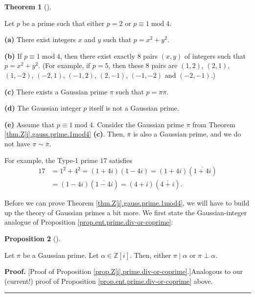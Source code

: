 \documentclass[numbers=enddot,12pt,final,onecolumn,notitlepage]{scrartcl}%
\numberwithin{exer}{subsection}
\theoremstyle{definition}
\newtheorem{theo}{Theorem}[subsection]
\newenvironment{theorem}[1][]
{\begin{theo}[#1]\begin{leftbar}}
{\end{leftbar}\end{theo}}
\newtheorem{prop}[theo]{Proposition}
\newenvironment{proposition}[1][]
{\begin{prop}[#1]\begin{leftbar}}
{\end{leftbar}\end{prop}}
\newenvironment{proof}[1][Proof]{\noindent\textbf{#1.} }{\ \rule{0.5em}{0.5em}}
\begin{document}
\begin{theorem}
\label{thm.Z[i].gauss.prime.1mod4}Let $p$ be a prime such that either $p=2$ or
$p\equiv1\operatorname{mod}4$.

\textbf{(a)} There exist integers $x$ and $y$ such that $p=x^{2}+y^{2}$.

\textbf{(b)} If $p\equiv1\operatorname{mod}4$, then there exist exactly $8$
pairs $\left(  x,y\right)  $ of integers such that $p=x^{2}+y^{2}$. (For
example, if $p=5$, then these $8$ pairs are $\left(  1,2\right)  $, $\left(
2,1\right)  $, $\left(  1,-2\right)  $, $\left(  -2,1\right)  $, $\left(
-1,2\right)  $, $\left(  2,-1\right)  $, $\left(  -1,-2\right)  $ and $\left(
-2,-1\right)  $.)

\textbf{(c)} There exists a Gaussian prime $\pi$ such that $p=\pi\overline
{\pi}$.

\textbf{(d)} The Gaussian integer $p$ itself is not a Gaussian prime.

\textbf{(e)} Assume that $p\equiv1\operatorname{mod}4$. Consider the Gaussian
prime $\pi$ from Theorem \ref{thm.Z[i].gauss.prime.1mod4} \textbf{(c)}. Then,
$\overline{\pi}$ is also a Gaussian prime, and we do not have $\pi
\sim\overline{\pi}$.
\end{theorem}

For example, the Type-1 prime $17$ satisfies%
\begin{align*}
17  &  =1^{2}+4^{2}=\left(  1+4i\right)  \left(  1-4i\right)  =\left(
1+4i\right)  \left(  \overline{1+4i}\right) \\
&  =\left(  1-4i\right)  \left(  \overline{1-4i}\right)  =\left(  4+i\right)
\left(  \overline{4+i}\right)  .
\end{align*}


Before we can prove Theorem \ref{thm.Z[i].gauss.prime.1mod4}, we will have to
build up the theory of Gaussian primes a bit more. We first state the
Gaussian-integer analogue of Proposition \ref{prop.ent.prime.div-or-coprime}:

\begin{proposition}
\label{prop.Z[i].prime.div-or-coprime}Let $\pi$ be a Gaussian prime. Let
$\alpha\in\mathbb{Z}\left[  i\right]  $. Then, either $\pi\mid\alpha$ or
$\pi\perp\alpha$.
\end{proposition}

\begin{proof}
[Proof of Proposition \ref{prop.Z[i].prime.div-or-coprime}.]Analogous to our
(current!) proof of Proposition \ref{prop.ent.prime.div-or-coprime} above.
\end{proof}
\end{document}
